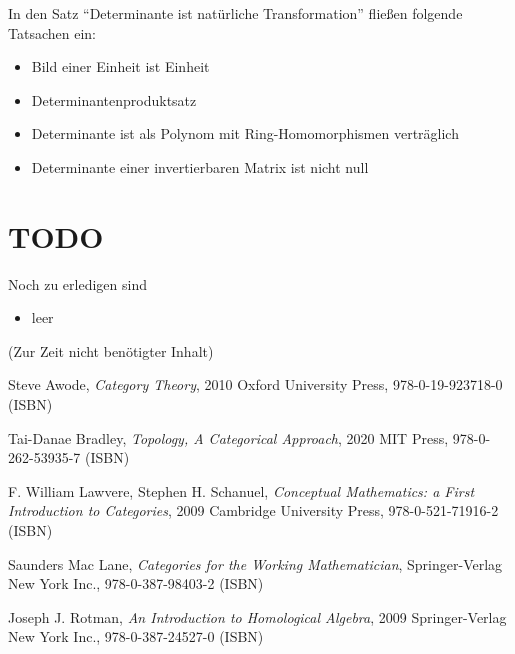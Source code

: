 \documentclass[a4paper]{amsart}
\theoremstyle{definition}
\begin{document}
In den Satz "`Determinante ist natürliche Transformation"' fließen folgende Tatsachen ein: 
\begin{itemize}
   \item Bild einer Einheit ist Einheit
   \item Determinantenproduktsatz
   \item Determinante ist als Polynom mit Ring-Homomorphismen verträglich
   \item Determinante einer invertierbaren Matrix ist nicht null
\end{itemize}

\section{TODO}
\begin{backup}
Noch zu erledigen sind
\begin{itemize}
   \item leer
\end{itemize}
\end{backup}

\begin{backup}
    (Zur Zeit nicht benötigter Inhalt)
\end{backup}

\begin{thebibliography}{9}
      Steve Awode, \emph{Category Theory},
      2010 Oxford University Press, 978-0-19-923718-0 (ISBN)

      Tai-Danae Bradley, \emph{Topology, A Categorical Approach},
      2020 MIT Press, 978-0-262-53935-7 (ISBN)

      F. William Lawvere, Stephen H. Schanuel, \emph{Conceptual Mathematics: a First Introduction to Categories},
      2009 Cambridge University Press, 978-0-521-71916-2 (ISBN)

      Saunders Mac Lane, \emph{Categories for the Working Mathematician},
      Springer-Verlag New York Inc., 978-0-387-98403-2 (ISBN)

   	Joseph J. Rotman, \emph{An Introduction to Homological Algebra},
   	2009 Springer-Verlag New York Inc., 978-0-387-24527-0 (ISBN)
      
\end{thebibliography}
\end{document}
